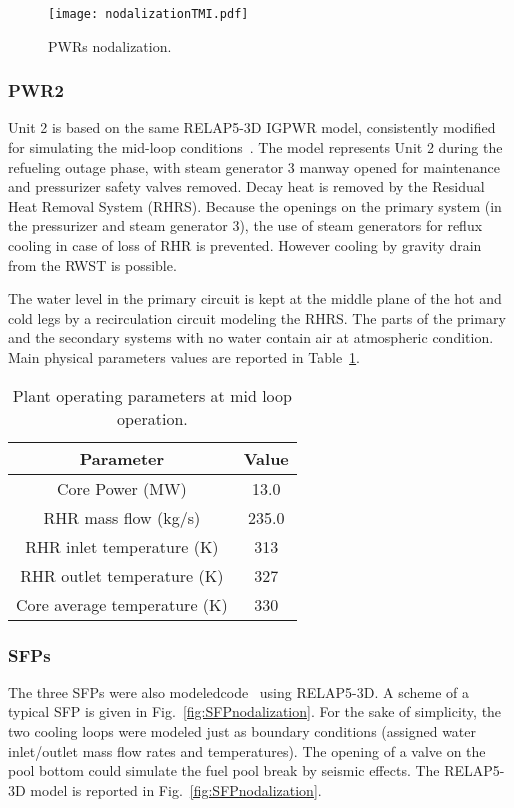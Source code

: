 \begin{figure}
    \centering
    \texttt{[image: nodalizationTMI.pdf]}
    \caption{PWRs nodalization.}
    \label{fig:PWRnodalization}
\end{figure}

\subsubsection{PWR2}
Unit 2 is based on the same RELAP5-3D IGPWR model, consistently modified for simulating the 
mid-loop conditions~\cite{NUREGCR6144}. The model represents Unit 2 
during the refueling outage phase, with steam generator 3 manway opened for maintenance and pressurizer safety 
valves removed. Decay heat is removed by the Residual Heat Removal System (RHRS). Because the 
openings on the primary system (in the pressurizer and steam generator 3), the use of steam generators 
for reflux cooling in case 
of loss of RHR is prevented. However cooling by gravity drain from the RWST is possible.

The water level in the primary circuit is kept at the middle plane of the hot and cold legs 
by a recirculation circuit modeling the RHRS. 
The parts of the primary and the secondary systems with no water contain air at atmospheric condition.  
Main physical parameters values are reported in Table~\ref{tab:midLoopParamteres}.

\begin{table}
   \centering
   \begin{tabular}{|c|c|}
     \hline
     \textbf{Parameter}           & \textbf{Value}   \\ \hline \hline
     Core Power (MW)              & 13.0    \\ \hline
     RHR mass flow (kg/s)         & 235.0   \\ \hline
     RHR inlet temperature (K)    & 313     \\ \hline
     RHR outlet temperature (K)   & 327     \\ \hline
     Core average temperature (K) & 330     \\ \hline
  \end{tabular}
  \caption{Plant operating parameters at mid loop operation.}
  \label{tab:midLoopParamteres}
\end{table} 

\subsubsection{SFPs}
The three SFPs were also modeledcode~\cite{parisiExternalAnalysis} using RELAP5-3D. 
A scheme of a typical SFP is given in Fig.~\ref{fig:SFPnodalization}. 
For the sake of simplicity, the two cooling loops were modeled just as boundary conditions 
(assigned water inlet/outlet mass flow rates and temperatures). The opening of a valve on the pool bottom
could simulate the fuel pool break by seismic effects. The RELAP5-3D model is reported in Fig.~\ref{fig:SFPnodalization}.


